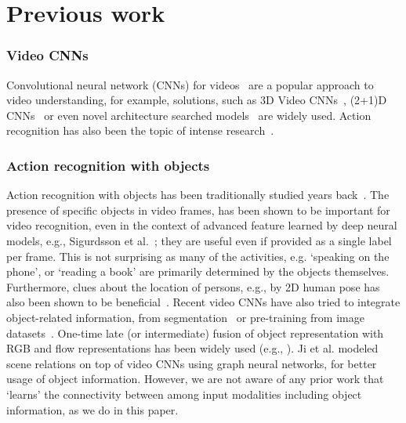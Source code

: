 \documentclass[runningheads]{llncs}
\begin{document}
\section{Previous work}


\subsubsection{Video CNNs} 

Convolutional neural network (CNNs) for videos~\cite{simonyan2014two,carreira2017quo,Feichtenhofer2016Spatiotemporal,feichtenhofer2018slowfast,qiu2017learning,Wang2016apperance,kay2017kinetics,xie2018rethinking,tran2014c3d,tran2018closer} are a popular approach to video understanding, for example, solutions, such as 3D Video CNNs~\cite{taylor2010conv,3dconv,tran2015learning,carreira2017quo,tran2014c3d,hara2017learning}, (2+1)D CNNs~\cite{tran2018closer} or even novel architecture searched models~\cite{nekrasov2019architecture,piergiovanni2018evolving,ryoo2019assemblenet} are widely used.
Action recognition has also been the topic of intense research~\cite{girdhar2017actionvlad,wang2011action}.


\subsubsection{Action recognition with objects}

Action recognition with objects has been traditionally studied years back~\cite{moore1999object}.
The presence of specific objects in video frames, has been shown to be important for video recognition, even in the context of advanced feature learned by deep neural models, e.g., Sigurdsson et al.~\cite{sigurdsson2017what}; they are useful even if provided as a single label per frame. This is not surprising as many of the activities, e.g. `speaking on the phone', or `reading a book' are primarily determined by the objects themselves. Furthermore, clues about the location of persons, e.g., by 2D human pose has also been shown to be beneficial~\cite{das2019toyota}. Recent video CNNs have also tried to integrate object-related information, from segmentation~\cite{baradel2018object,ray2018SOA} or pre-training from image datasets~\cite{diba2019holistic}. One-time late (or intermediate) fusion of object representation with RGB and flow representations has been widely used (e.g., \cite{ma2016first}). Ji et al. \cite{ji2020genome} modeled scene relations on top of video CNNs using graph neural networks, for better usage of object information. However, we are not aware of any prior work that `learns' the connectivity between among input modalities including object information, as we do in this paper.
\end{document}
